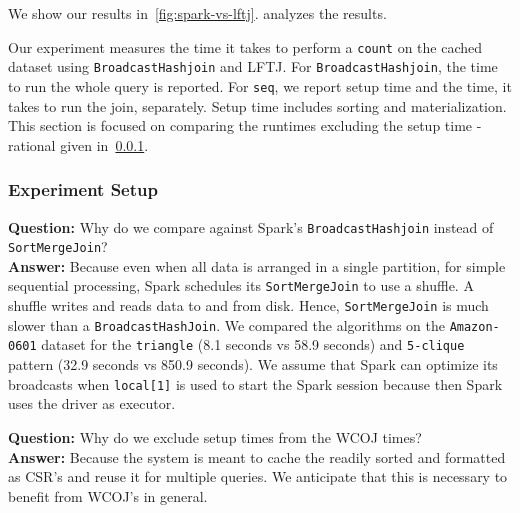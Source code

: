We show our results in~\cref{fig:spark-vs-lftj}.
 analyzes the results.

Our experiment measures the time it takes to perform a \texttt{count} on the cached dataset using \texttt{BroadcastHashjoin} and
\textsc{LFTJ}.
For \texttt{BroadcastHashjoin}, the time to run the whole query is reported.
For \texttt{seq}, we report setup time and the time, it takes to run the join, separately.
Setup time includes sorting and materialization.
This section is focused on comparing the runtimes excluding the setup time - rational given in~\cref{sssec:seq-experiment-rational}.

\subsubsection{Experiment Setup}\label{sssec:seq-experiment-rational}
\textbf{Question:} Why do we compare against Spark's \texttt{BroadcastHashjoin} instead of \texttt{SortMergeJoin}? \\
\textbf{Answer:} Because even when all data is arranged in a single partition, for simple sequential processing, Spark
schedules its \texttt{SortMergeJoin} to use a shuffle.
A shuffle writes and reads data to and from disk.
Hence, \texttt{SortMergeJoin} is much slower than a \texttt{BroadcastHashJoin}.
We compared the algorithms on the \texttt{Amazon-0601} dataset for the \texttt{triangle} (8.1 seconds vs 58.9 seconds) and
\texttt{5-clique} pattern (32.9 seconds vs 850.9 seconds).
We assume that Spark can optimize its broadcasts when \texttt{local[1]} is used to start the Spark session because then Spark uses the driver as executor.

\textbf{Question:} Why do we exclude setup times from the WCOJ times?\\
\textbf{Answer:} Because the system is meant to cache the readily sorted and formatted as \textsc{CSR}'s and reuse it for multiple queries.
We anticipate that this is necessary to benefit from \textsc{WCOJ}'s in general.


